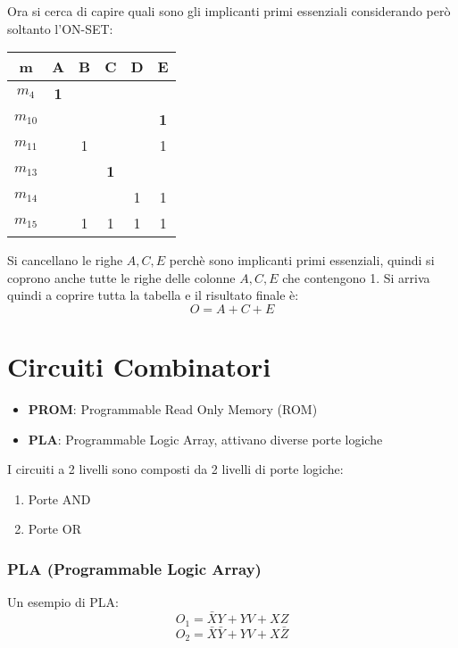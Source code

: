 \documentclass[a4paper]{article}
\theoremstyle{break}
\theoremstyle{break}
\theoremstyle{break}
\theoremstyle{break}
\begin{document}
\begin{example}
        Ora si cerca di capire quali sono gli implicanti primi essenziali considerando
        però soltanto l'ON-SET:
        \begin{center}
            \begin{tabular}{c|c|c|c|c|c}
                m & A & B & C & D & E \\
                \hline
                \( m_4 \) & \textbf{1} &  &  &  &  \\ 
                \hline
                \( m_{10} \) &  &  &  &  & \textbf{1} \\
                \hline
                \( m_{11} \) &  & 1 &  &  & 1 \\
                \hline
                \( m_{13} \) &  &  & \textbf{1} &  &  \\
                \hline
                \( m_{14} \) &  &  &  & 1 & 1 \\
                \hline
                \( m_{15} \) &  & 1 & 1 & 1 & 1 
            \end{tabular}
        \end{center}
        Si cancellano le righe \( A, C, E \) perchè sono implicanti primi essenziali,
        quindi si coprono anche tutte le righe delle colonne \( A, C, E \) che
        contengono 1. Si arriva quindi a coprire tutta la tabella e il risultato
        finale è:
        \[
        O = A + C + E
        \] 
\end{example}



\section{Circuiti Combinatori}
\begin{itemize}
    \item \textbf{PROM}: Programmable Read Only Memory (ROM)
        \item \textbf{PLA}: Programmable Logic Array, attivano diverse porte logiche
\end{itemize}
I circuiti a 2 livelli sono composti da 2 livelli di porte logiche:
\begin{enumerate}
    \item Porte AND
        \item Porte OR
\end{enumerate}

\subsubsection{PLA (Programmable Logic Array)}
\begin{example}
    Un esempio di PLA:
    \[
    O_1 = \bar{X}Y + YV + XZ
    \] 
    \[
        O_2 = \bar{X}\bar{Y} + YV + X\bar{Z}
    \] 
    \label{D1}
\end{example}
\end{document}
